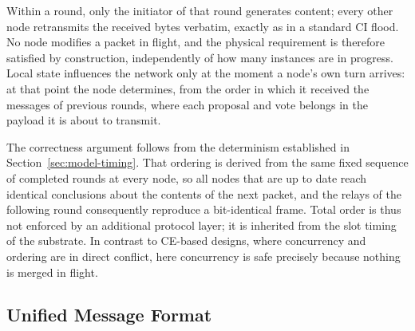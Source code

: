 \documentclass[journal]{IEEEtran}
\newcommand{\CI}{CI}                      %
\newcommand{\CE}{CE}                      %
\begin{document}
Within a round, only the initiator of that round generates content; every
other node retransmits the received bytes verbatim, exactly as in a
standard \CI{} flood. No node modifies a packet in flight, and the
physical requirement is therefore satisfied by construction, independently
of how many instances are in progress. Local state influences the network
only at the moment a node's own turn arrives: at that point the node
determines, from the order in which it received the messages of previous
rounds, where each proposal and vote belongs in the payload it is about to
transmit.

The correctness argument follows from the determinism established in
Section~\ref{sec:model-timing}. That ordering is derived from the same
fixed sequence of completed rounds at every node, so all nodes that are
up to date reach identical conclusions about the contents of the next
packet, and the relays of the following round consequently reproduce a
bit-identical frame. Total order is thus not enforced by an additional
protocol layer; it is inherited from the slot timing of the substrate. In
contrast to \CE-based designs, where concurrency and ordering are in
direct conflict, here concurrency is safe precisely because nothing is
merged in flight.

\subsection{Unified Message Format}
\label{sec:design-format}
\end{document}
